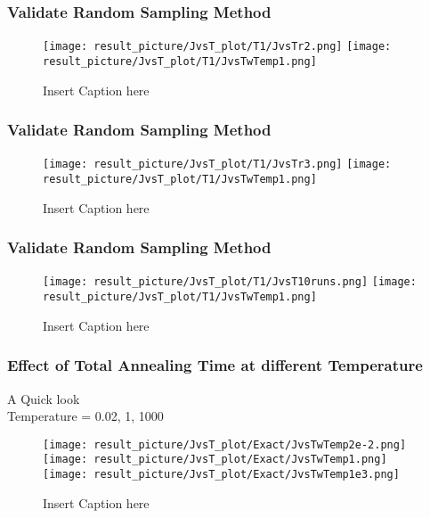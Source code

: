 \documentclass{beamer}
\begin{document}
\begin{frame}
	\frametitle{Validate Random Sampling Method}
	\begin{figure}
		\centering
		\texttt{[image: result\_picture/JvsT\_plot/T1/JvsTr2.png]}
		\hfill
		\texttt{[image: result\_picture/JvsT\_plot/T1/JvsTwTemp1.png]}		
		
		\caption{Insert Caption here}
	\end{figure}
\end{frame}


\begin{frame}
	\frametitle{Validate Random Sampling Method}
	\begin{figure}
		\centering
		\texttt{[image: result\_picture/JvsT\_plot/T1/JvsTr3.png]}
		\hfill
		\texttt{[image: result\_picture/JvsT\_plot/T1/JvsTwTemp1.png]}		
		
		\caption{Insert Caption here}
	\end{figure}
\end{frame}

\begin{frame}
	\frametitle{Validate Random Sampling Method}
	\begin{figure}
		\centering
		\texttt{[image: result\_picture/JvsT\_plot/T1/JvsT10runs.png]}
		\hfill
		\texttt{[image: result\_picture/JvsT\_plot/T1/JvsTwTemp1.png]}		
		
		\caption{Insert Caption here}
	\end{figure}
\end{frame}

\begin{frame}
	\frametitle{Effect of Total Annealing Time at different Temperature}
	A Quick look\\
	Temperature = 0.02, 1, 1000
	\begin{figure}
		\centering
		\texttt{[image: result\_picture/JvsT\_plot/Exact/JvsTwTemp2e-2.png]}
		\hfill
		\texttt{[image: result\_picture/JvsT\_plot/Exact/JvsTwTemp1.png]}
		\hfill
		\texttt{[image: result\_picture/JvsT\_plot/Exact/JvsTwTemp1e3.png]}
		\caption{Insert Caption here}
	\end{figure}
\end{frame}
\end{document}
